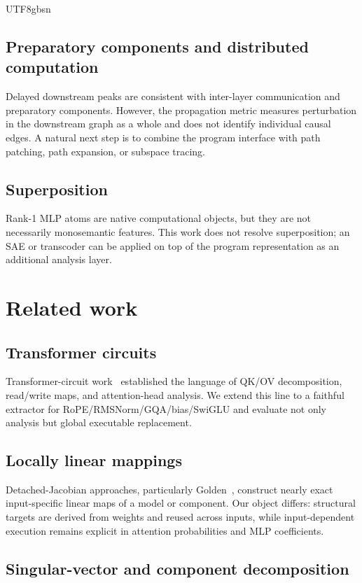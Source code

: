 \documentclass[11pt]{article}
\begin{document}
\begin{CJK*}{UTF8}{gbsn}
\subsection{Preparatory components and distributed
computation}

Delayed downstream peaks are consistent with inter-layer communication
and preparatory components. However, the propagation metric measures
perturbation in the downstream graph as a whole and does not identify
individual causal edges. A natural next step is to combine the program
interface with path patching, path expansion, or subspace tracing.

\subsection{Superposition}

Rank-1 MLP atoms are native computational objects, but they are not
necessarily monosemantic features. This work does not resolve
superposition; an SAE or transcoder can be applied on top of the program
representation as an additional analysis layer.

\section{Related work}

\subsection{Transformer circuits}

Transformer-circuit work~\citep{elhage2021framework} established the language of QK/OV
decomposition, read/write maps, and attention-head analysis. We extend
this line to a faithful extractor for RoPE/RMSNorm/GQA/bias/SwiGLU and
evaluate not only analysis but global executable replacement.

\subsection{Locally linear
mappings}

Detached-Jacobian approaches, particularly Golden~\citep{golden2025locally}, construct nearly
exact input-specific linear maps of a model or component. Our object
differs: structural targets are derived from weights and reused across
inputs, while input-dependent execution remains explicit in attention
probabilities and MLP coefficients.

\subsection{Singular-vector and component
decomposition}


\end{CJK*}
\end{document}
